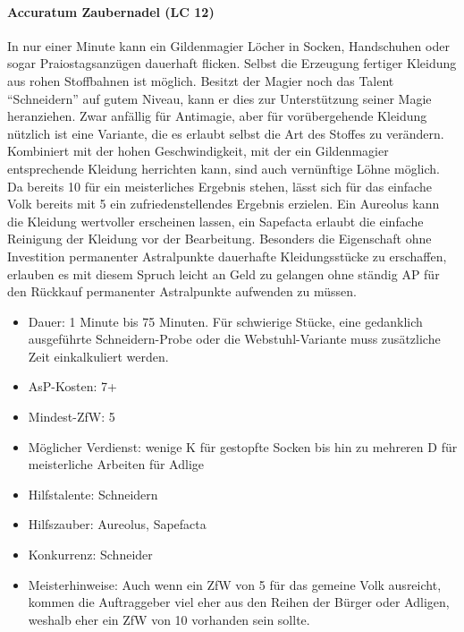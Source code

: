 \paragraph{Accuratum Zaubernadel (LC 12)}
In nur einer Minute kann ein Gildenmagier Löcher in Socken, Handschuhen oder sogar Praiostagsanzügen dauerhaft flicken. Selbst die Erzeugung fertiger Kleidung aus rohen Stoffbahnen ist möglich. Besitzt der Magier noch das Talent \enquote{Schneidern} auf gutem Niveau, kann er dies zur Unterstützung seiner Magie heranziehen. Zwar anfällig für Antimagie, aber für vorübergehende Kleidung nützlich ist eine Variante, die es erlaubt selbst die Art des Stoffes zu verändern. Kombiniert mit der hohen Geschwindigkeit, mit der ein Gildenmagier entsprechende Kleidung herrichten kann, sind auch vernünftige Löhne möglich. Da bereits \SI{10}{\ZfPstern} für ein meisterliches Ergebnis stehen, lässt sich für das einfache Volk bereits mit \SI{5}{\ZfPstern} ein zufriedenstellendes Ergebnis erzielen. Ein Aureolus kann die Kleidung wertvoller erscheinen lassen, ein Sapefacta erlaubt die einfache Reinigung der Kleidung vor der Bearbeitung. Besonders die Eigenschaft ohne Investition permanenter Astralpunkte dauerhafte Kleidungsstücke zu erschaffen, erlauben es mit diesem Spruch leicht an Geld zu gelangen ohne ständig AP für den Rückkauf permanenter Astralpunkte aufwenden zu müssen.
\begin{itemize}
	\item Dauer: 1 Minute bis 75 Minuten. Für schwierige Stücke, eine gedanklich ausgeführte Schneidern-Probe oder die Webstuhl-Variante muss zusätzliche Zeit einkalkuliert werden.
	\item AsP-Kosten: 7+
	\item Mindest-ZfW: 5
	\item Möglicher Verdienst: wenige K für gestopfte Socken bis hin zu mehreren D für meisterliche Arbeiten für Adlige
	\item Hilfstalente: Schneidern
	\item Hilfszauber: Aureolus, Sapefacta
	\item Konkurrenz: Schneider
	\item Meisterhinweise: Auch wenn ein ZfW von 5 für das gemeine Volk ausreicht, kommen die Auftraggeber viel eher aus den Reihen der Bürger oder Adligen, weshalb eher ein ZfW von 10 vorhanden sein sollte.
\end{itemize}

